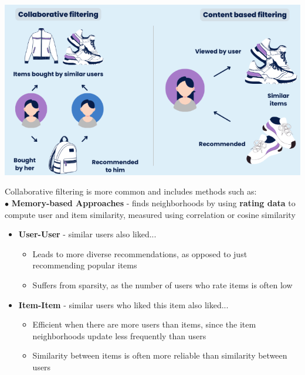 \documentclass[letterpaper, 10.5pt,landscape]{article}
\begin{document}
\begin{multicols*}{3}
\vspace{-5pt}
\begin{center}
    \begin{minipage}{\linewidth}
    \includegraphics[width=\textwidth]{figures/collaborative_content_recommender_system.png}
    \end{minipage}
\end{center}
\vspace{-5pt}



Collaborative filtering is more common and includes methods such as: \\
$\bullet$ \textbf{Memory-based Approaches} - finds neighborhoods by using \textbf{rating data} to compute user and item similarity, measured using correlation or cosine similarity

\begin{itemize}[label={--},leftmargin=4mm]
\vspace{-3pt}
\item \textbf{User-User} - similar users also liked...
\vspace{-3pt}
\begin{itemize}[label={--},leftmargin=4mm]
    \vspace{-3pt}
    \item Leads to more diverse recommendations, as opposed to just recommending popular items
    \vspace{-3pt}
    \item Suffers from sparsity, as the number of users who rate items is often low
    \end{itemize}
    \vspace{-1mm}
\item \textbf{Item-Item} - similar users who liked this item also liked...
    \vspace{-3pt}
    \begin{itemize}[label={--},leftmargin=4mm]
    \vspace{-3pt}
    \item Efficient when there are more users than items, since the item neighborhoods update less frequently than users
    \vspace{-3pt}
    \item Similarity between items is often more reliable than similarity between users
    \end{itemize}
\end{itemize}
\vspace{-1.5mm}
\smallskip



\end{multicols*}
\end{document}
